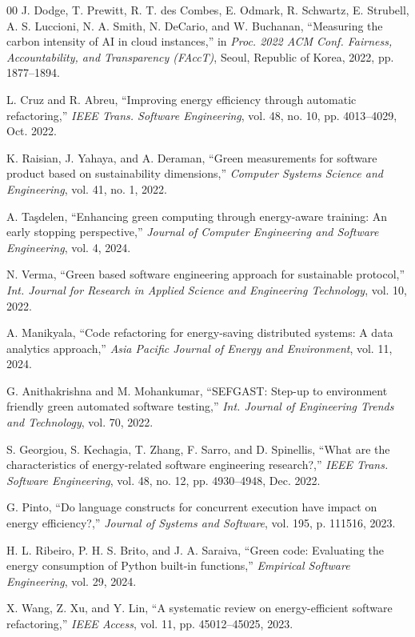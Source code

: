 \documentclass[conference]{IEEEtran}
\begin{document}
\begin{thebibliography}{00}
J. Dodge, T. Prewitt, R. T. des Combes, E. Odmark, R. Schwartz, E. Strubell,
A. S. Luccioni, N. A. Smith, N. DeCario, and W. Buchanan, ``Measuring the
carbon intensity of AI in cloud instances,'' in \textit{Proc. 2022 ACM Conf.
Fairness, Accountability, and Transparency (FAccT)}, Seoul, Republic of Korea,
2022, pp. 1877--1894.

L. Cruz and R. Abreu, ``Improving energy efficiency through automatic
refactoring,'' \textit{IEEE Trans. Software Engineering}, vol. 48, no. 10,
pp. 4013--4029, Oct. 2022.

K. Raisian, J. Yahaya, and A. Deraman, ``Green measurements for software
product based on sustainability dimensions,'' \textit{Computer Systems Science
and Engineering}, vol. 41, no. 1, 2022.

A. Taşdelen, ``Enhancing green computing through energy-aware training: An
early stopping perspective,'' \textit{Journal of Computer Engineering and
Software Engineering}, vol. 4, 2024.

N. Verma, ``Green based software engineering approach for sustainable
protocol,'' \textit{Int. Journal for Research in Applied Science and
Engineering Technology}, vol. 10, 2022.

A. Manikyala, ``Code refactoring for energy-saving distributed systems: A
data analytics approach,'' \textit{Asia Pacific Journal of Energy and
Environment}, vol. 11, 2024.

G. Anithakrishna and M. Mohankumar, ``SEFGAST: Step-up to environment
friendly green automated software testing,'' \textit{Int. Journal of
Engineering Trends and Technology}, vol. 70, 2022.

S. Georgiou, S. Kechagia, T. Zhang, F. Sarro, and D. Spinellis, ``What are
the characteristics of energy-related software engineering research?,''
\textit{IEEE Trans. Software Engineering}, vol. 48, no. 12,
pp. 4930--4948, Dec. 2022.

G. Pinto, ``Do language constructs for concurrent execution have impact on
energy efficiency?,'' \textit{Journal of Systems and Software}, vol. 195,
p. 111516, 2023.

H. L. Ribeiro, P. H. S. Brito, and J. A. Saraiva, ``Green code: Evaluating
the energy consumption of Python built-in functions,'' \textit{Empirical
Software Engineering}, vol. 29, 2024.

X. Wang, Z. Xu, and Y. Lin, ``A systematic review on energy-efficient
software refactoring,'' \textit{IEEE Access}, vol. 11, pp. 45012--45025, 2023.


\end{thebibliography}
\end{document}
